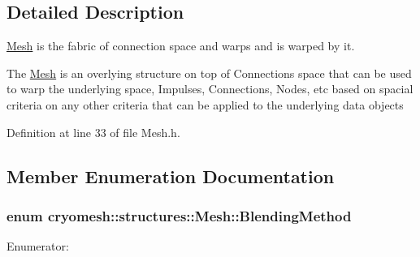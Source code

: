 \subsection{\-Detailed \-Description}
\hyperlink{classcryomesh_1_1structures_1_1Mesh}{\-Mesh} is the fabric of connection space and warps and is warped by it. 

\-The \hyperlink{classcryomesh_1_1structures_1_1Mesh}{\-Mesh} is an overlying structure on top of \-Connections space that can be used to warp the underlying space, \-Impulses, \-Connections, \-Nodes, etc based on spacial criteria on any other criteria that can be applied to the underlying data objects 

\-Definition at line 33 of file \-Mesh.\-h.



\subsection{\-Member \-Enumeration \-Documentation}
\hypertarget{classcryomesh_1_1structures_1_1Mesh_a5899ce5c4ac651fe82d0bd7b25d4b743}{
\subsubsection[{\-Blending\-Method}]{\setlength{\rightskip}{0pt plus 5cm}enum {\bf cryomesh\-::structures\-::\-Mesh\-::\-Blending\-Method}}}\label{classcryomesh_1_1structures_1_1Mesh_a5899ce5c4ac651fe82d0bd7b25d4b743}
\begin{Desc}
\item[\-Enumerator\-: ]\par
\begin{description}
\item[{\em 
\hypertarget{classcryomesh_1_1structures_1_1Mesh_a5899ce5c4ac651fe82d0bd7b25d4b743a9e12dc9ac54b6b1eadbe806b90caf332}{\-B\-L\-E\-N\-D\-\_\-\-L\-I\-N\-E\-A\-R}\label{classcryomesh_1_1structures_1_1Mesh_a5899ce5c4ac651fe82d0bd7b25d4b743a9e12dc9ac54b6b1eadbe806b90caf332}
}]\end{description}
\end{Desc}



